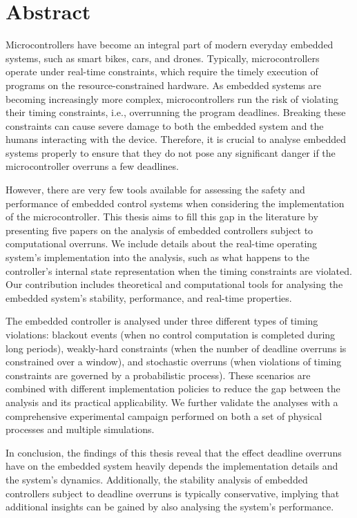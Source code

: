 \chapter*{Abstract}

Microcontrollers have become an integral part of modern everyday embedded systems, such as smart bikes, cars, and drones.
Typically, microcontrollers operate under real-time constraints, which require the timely execution of programs on the resource-constrained hardware.
As embedded systems are becoming increasingly more complex, microcontrollers run the risk of violating their timing constraints, i.e., overrunning the program deadlines.
Breaking these constraints can cause severe damage to both the embedded system and the humans interacting with the device.
Therefore, it is crucial to analyse embedded systems properly to ensure that they do not pose any significant danger if the microcontroller overruns a few deadlines.

However, there are very few tools available for assessing the safety and performance of embedded control systems when considering the implementation of the microcontroller.
This thesis aims to fill this gap in the literature by presenting five papers on the analysis of embedded controllers subject to computational overruns.
We include details about the real-time operating system's implementation into the analysis, such as what happens to the controller's internal state representation when the timing constraints are violated.
Our contribution includes theoretical and computational tools for analysing the embedded system's stability, performance, and real-time properties.

The embedded controller is analysed under three different types of timing violations: blackout events (when no control computation is completed during long periods), weakly-hard constraints (when the number of deadline overruns is constrained over a window), and stochastic overruns (when violations of timing constraints are governed by a probabilistic process).
These scenarios are combined with different implementation policies to reduce the gap between the analysis and its practical applicability.
We further validate the analyses with a comprehensive experimental campaign performed on both a set of physical processes and multiple simulations.

In conclusion, the findings of this thesis reveal that the effect deadline overruns have on the embedded system heavily depends the implementation details and the system's dynamics.
Additionally, the stability analysis of embedded controllers subject to deadline overruns is typically conservative, implying that additional insights can be gained by also analysing the system's performance.



